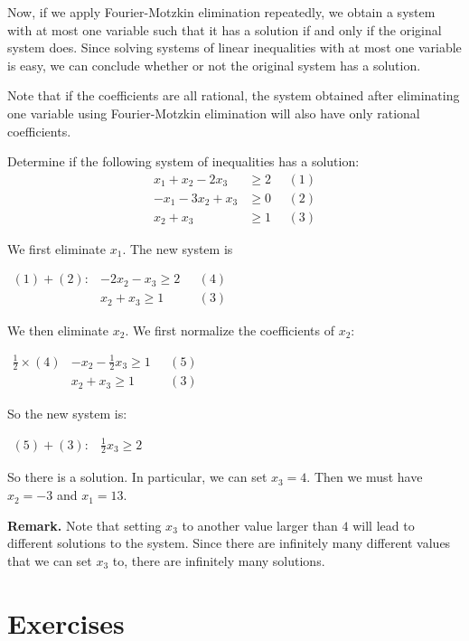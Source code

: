 \documentclass[]{book}
\theoremstyle{definition}
\theoremstyle{definition}
\theoremstyle{remark}
\let\BeginKnitrBlock\begin \let\EndKnitrBlock\end
\begin{document}
Now, if we apply Fourier-Motzkin elimination repeatedly, we obtain a
system with at most one variable such that it has a solution if and only
if the original system does. Since solving systems of linear
inequalities with at most one variable is easy, we can conclude whether
or not the original system has a solution.

Note that if the coefficients are all rational, the system obtained
after eliminating one variable using Fourier-Motzkin elimination will
also have only rational coefficients.

\BeginKnitrBlock{example}
\protect\hypertarget{ex:unnamed-chunk-1}{}{\label{ex:unnamed-chunk-1}}Determine
if the following system of inequalities has a solution:
\begin{align*}
x_1 + x_2 - 2x_3 & \geq 2 ~~~~~~(1)\\
-x_1 - 3x_2 + x_3 & \geq 0~~~~~~(2) \\
x_2 + x_3 & \geq 1~~~~~~(3) 
\end{align*}

We first eliminate \(x_1\). The new system is

\(\begin{array}{rrl} (1) + (2): & -2x_2 - x_3 \geq 2 & ~~~(4) \\  & x_2 + x_3 \geq 1 & ~~~(3) \end{array}\)

We then eliminate \(x_2\). We first normalize the coefficients of
\(x_2\):

\(\begin{array}{rrl} \frac{1}{2}\times (4) & -x_2 - \frac{1}{2}x_3 \geq 1 & ~~~(5) \\  & x_2 + x_3 \geq 1 & ~~~(3) \end{array} \)

So the new system is:

\(\begin{array}{rl} (5)+(3): & \frac{1}{2} x_3 \geq 2 \end{array} \)

So there is a solution. In particular, we can set \(x_3 = 4\). Then we
must have \(x_2 = -3\) and \(x_1 = 13\).
\EndKnitrBlock{example}

\textbf{Remark.} Note that setting \(x_3\) to another value larger than
\(4\) will lead to different solutions to the system. Since there are
infinitely many different values that we can set \(x_3\) to, there are
infinitely many solutions.

\section*{Exercises}\label{exercises-3}
\end{document}
